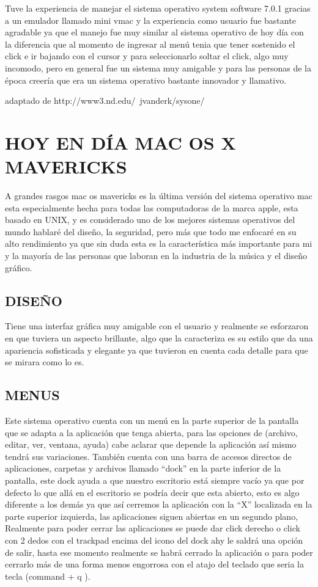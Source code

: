 Tuve la experiencia de manejar el sistema operativo system
software 7.0.1 gracias a un emulador llamado mini vmac y la
experiencia como usuario fue bastante agradable ya que el
manejo fue muy similar al sistema operativo de hoy día con la
diferencia que al momento de ingresar al menú tenia que tener
sostenido el click e ir bajando con el cursor y para seleccionarlo
soltar el click, algo muy incomodo, pero en general fue un
sistema muy amigable y para las personas de la época creería
que era un sistema operativo bastante innovador y llamativo.

adaptado de http://www3.nd.edu/~jvanderk/sysone/

\section*{HOY EN DÍA MAC OS X MAVERICKS}

A grandes rasgos mac os mavericks es la última versión del
sistema operativo mac esta especialmente hecha para todas las
computadoras de la marca apple, esta basado en UNIX, y es
considerado uno de los mejores sistemas operativos del mundo
hablaré del diseño, la seguridad, pero más que todo me enfocaré
en su alto rendimiento ya que sin duda esta es la característica
más importante para mi y la mayoría de las personas que
laboran en la industria de la música y el diseño gráfico.

\subsection*{DISEÑO}

Tiene una interfaz gráfica muy amigable con el usuario y
realmente se esforzaron en que tuviera un aspecto brillante,
algo que la caracteriza es su estilo que da una apariencia
sofisticada y elegante ya que tuvieron en cuenta cada detalle
para que se mirara como lo es.

\subsection*{MENUS}

Este sistema operativo cuenta con un menú en la parte superior
de la pantalla que se adapta a la aplicación que tenga abierta,
para las opciones de (archivo, editar, ver, ventana, ayuda) cabe
aclarar que depende la aplicación así mismo tendrá sus
variaciones. También cuenta con una barra de accesos directos
de aplicaciones, carpetas y archivos llamado “dock” en la parte
inferior de la pantalla, este dock ayuda a que nuestro escritorio
está siempre vacío ya que por defecto lo que allá en el escritorio
se podría decir que esta abierto, esto es algo diferente a los
demás ya que así cerremos la aplicación con la “X” localizada en
la parte superior izquierda, las aplicaciones siguen abiertas en
un segundo plano, Realmente para poder cerrar las aplicaciones se puede dar click
derecho o click con 2 dedos con el trackpad encima del icono del
dock ahy le saldrá una opción de salir, hasta ese momento
realmente se habrá cerrado la aplicación o para poder cerrarlo
más de una forma menos engorrosa con el atajo del teclado que
seria la tecla (command + q ).

